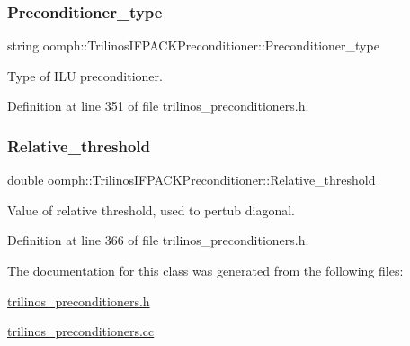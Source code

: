 \subsubsection{\texorpdfstring{Preconditioner\+\_\+type}{Preconditioner\_type}}
{\footnotesize\ttfamily string oomph\+::\+Trilinos\+I\+F\+P\+A\+C\+K\+Preconditioner\+::\+Preconditioner\+\_\+type\hspace{0.3cm}{\ttfamily [protected]}}



Type of I\+LU preconditioner. 



Definition at line 351 of file trilinos\+\_\+preconditioners.\+h.

\mbox{\label{classoomph_1_1TrilinosIFPACKPreconditioner_ab8ff6d7a83c6c0c27ede4bd35b3d5628}} 
\subsubsection{\texorpdfstring{Relative\+\_\+threshold}{Relative\_threshold}}
{\footnotesize\ttfamily double oomph\+::\+Trilinos\+I\+F\+P\+A\+C\+K\+Preconditioner\+::\+Relative\+\_\+threshold\hspace{0.3cm}{\ttfamily [protected]}}



Value of relative threshold, used to pertub diagonal. 



Definition at line 366 of file trilinos\+\_\+preconditioners.\+h.



The documentation for this class was generated from the following files\+:\begin{DoxyCompactItemize}
\item 
\hyperlink{trilinos__preconditioners_8h}{trilinos\+\_\+preconditioners.\+h}\item 
\hyperlink{trilinos__preconditioners_8cc}{trilinos\+\_\+preconditioners.\+cc}\end{DoxyCompactItemize}
